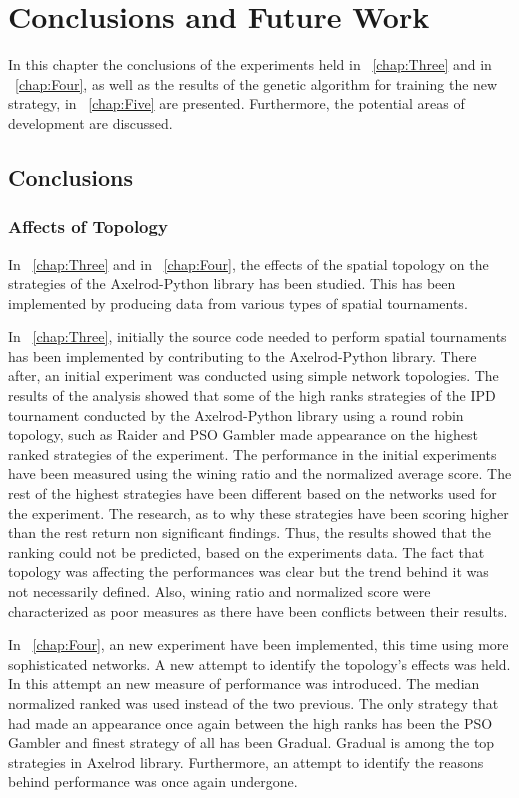 \chapter{Conclusions and Future Work}
\label{chap:Six}

In this chapter the conclusions of the experiments held in
~\autoref{chap:Three} and in ~\autoref{chap:Four}, as well as the results
of the genetic algorithm for training the new strategy, in ~\autoref{chap:Five}
are presented. Furthermore, the potential areas of development are discussed.

\section{Conclusions}
\subsection{Affects of Topology}

In ~\autoref{chap:Three} and in ~\autoref{chap:Four}, the effects of the spatial
topology on the strategies of the Axelrod-Python library has been studied. This
has been implemented by producing data from various types of spatial tournaments.

In ~\autoref{chap:Three}, initially the source code needed to perform spatial tournaments
has been implemented by contributing to the Axelrod-Python library. There after,
an initial experiment was conducted using simple network topologies.
The results of the analysis showed that some of the high ranks strategies
of the IPD tournament conducted by the Axelrod-Python library using a round robin
topology, such as Raider and PSO Gambler made appearance on the highest ranked
strategies of the experiment. The performance in the initial experiments have been
measured using the wining ratio and the normalized average score. The rest of
the highest strategies have been different based on the networks used for the
experiment. The research, as to why these strategies have been scoring higher than
the rest return non significant findings. Thus, the results showed that the ranking
could not be predicted, based on the experiments data. The fact that topology
was affecting the performances was clear but the trend behind it was not necessarily
defined. Also, wining ratio and normalized score were characterized as poor measures
as there have been conflicts between their results.

In ~\autoref{chap:Four}, an new experiment have been implemented, this time using
more sophisticated networks. A new attempt to identify the topology's effects
was held. In this attempt an new measure of performance was introduced. The median
normalized ranked was used instead of the two previous. The only strategy that had
made an appearance once again between the high ranks has been the PSO Gambler and
finest strategy of all has been Gradual. Gradual is among the top strategies in
Axelrod library. Furthermore, an attempt to identify the reasons behind performance
was once again undergone.

